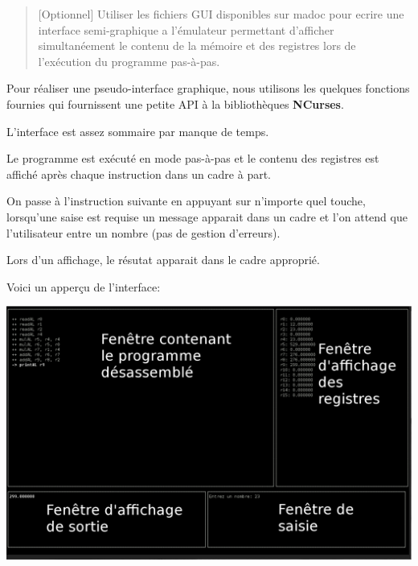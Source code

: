\documentclass[11pt,a4paper]{article}
\begin{document}
\begin{quote}
[Optionnel] Utiliser les fichiers GUI disponibles sur madoc pour ecrire une interface semi-graphique
a l’émulateur permettant d’afficher simultanéement le contenu de la mémoire et des registres lors de
l’exécution du programme pas-à-pas.
\end{quote}

Pour réaliser une pseudo-interface graphique, nous utilisons les quelques fonctions fournies qui fournissent
une petite API à la bibliothèques \textbf{NCurses}.

L'interface est assez sommaire par manque de temps.

Le programme est exécuté en mode pas-à-pas et le contenu des registres est affiché après chaque
instruction dans un cadre à part.

On passe à l'instruction suivante en appuyant sur n'importe quel touche, lorsqu'une saise est
requise un message apparait dans un cadre et l'on attend que l'utilisateur entre un nombre (pas de
gestion d'erreurs).

Lors d'un affichage, le résutat apparait dans le cadre approprié.

Voici un apperçu de l'interface:


\includegraphics[scale = 0.3]{./fgui.eps}
\end{document}
